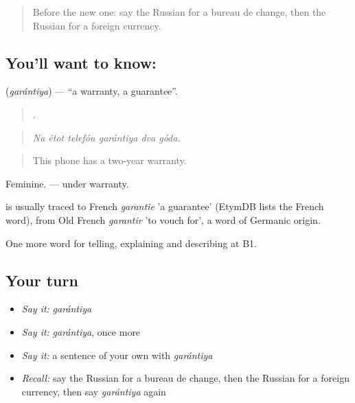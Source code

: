 \label{lesson:RU-C456-garantiya}



\begin{quote}
Before the new one: say the Russian for a bureau de change, then the Russian for a foreign currency.
\end{quote}

\subsection*{You'll want to know: }
\textbf{} (\emph{garántiya}) — \textquotedblleft{}a warranty, a guarantee\textquotedblright{}.

\begin{quote}
     .
\end{quote}

\begin{quote}
\emph{Na étot telefón garántiya dva góda.}
\end{quote}

\begin{quote}
This phone has a two-year warranty.
\end{quote}

Feminine. \emph{ } — under warranty.

\begin{cousinweb}
\emph{} is usually traced to French \emph{garantie} 'a guarantee' (EtymDB lists the French word), from Old French \emph{garantir} 'to vouch for', a word of Germanic origin.
\end{cousinweb}

\begin{grammarlens}[title={What you've built}]
One more word for telling, explaining and describing at B1.
\end{grammarlens}

\subsection*{Your turn}
\begin{itemize}
\raggedright
  \item \emph{Say it:} \emph{garántiya}
  \item \emph{Say it:} \emph{garántiya}, once more
  \item \emph{Say it:} a sentence of your own with \emph{garántiya}
  \item \emph{Recall:} say the Russian for a bureau de change, then the Russian for a foreign currency, then say \emph{garántiya} again
\end{itemize}

